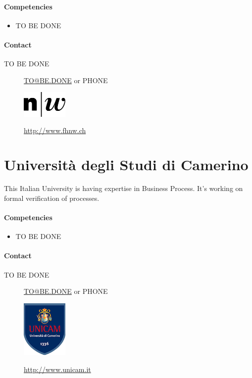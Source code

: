 \documentclass{learnpad}
\begin{document}
\paragraph{Competencies}
\begin{itemize}
	\item TO BE DONE
\end{itemize}

\paragraph{Contact}
\begin{description}
	\item[TO BE DONE] \href{mailto:TO@BE.DONE}{TO@BE.DONE} or PHONE
\end{description}

\begin{figure}[!htp]
	\centering
	\includegraphics[width=6em,keepaspectratio]{figures/fhnw.jpg}\par
	\url{http://www.fhnw.ch}
\end{figure}

\section{Università degli Studi di Camerino}
This Italian University is having expertise in Business Process.  It's working
on formal verification of processes.

\paragraph{Competencies}
\begin{itemize}
	\item TO BE DONE
\end{itemize}

\paragraph{Contact}
\begin{description}
	\item[TO BE DONE] \href{mailto:TO@BE.DONE}{TO@BE.DONE} or PHONE
\end{description}

\begin{figure}[!htp]
	\centering
	\includegraphics[width=6em,keepaspectratio]{figures/unicam.png}\par
	\url{http://www.unicam.it}
\end{figure}
\end{document}

